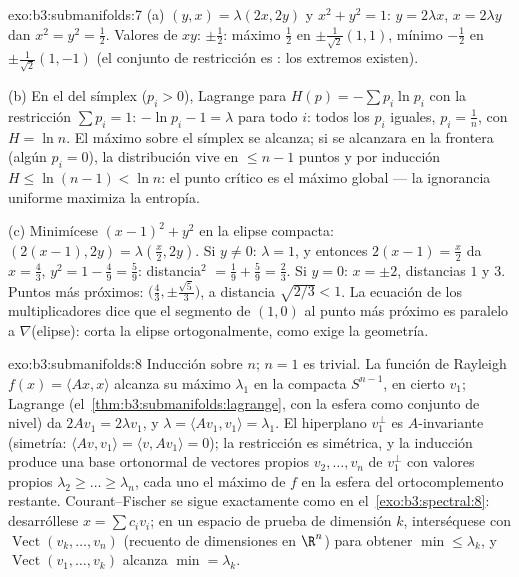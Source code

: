 \begin{solution}{exo:b3:submanifolds:7}
(a) $(y, x) = \lambda(2x, 2y)$ y $x^2 + y^2 = 1$: $y =
2\lambda x$, $x = 2\lambda y$ dan $x^2 = y^2 = \frac12$. Valores de
$xy$: $\pm\frac12$: máximo $\frac12$ en $\pm\frac1{\sqrt2}(1,1)$, mínimo
$-\frac12$ en $\pm\frac1{\sqrt2}(1,-1)$ (el conjunto de restricción es
: los extremos existen).

(b) En el  del símplex
($p_i > 0$), Lagrange para $H(p) = -\sum p_i\ln p_i$ con la restricción
$\sum p_i = 1$: $-\ln p_i - 1 = \lambda$ para todo $i$: todos los $p_i$
iguales, $p_i =
\frac1n$, con $H = \ln n$. El máximo sobre el símplex
 se alcanza; si se alcanzara
en la frontera (algún $p_i = 0$), la distribución vive en $\leq n - 1$
puntos y por inducción $H \leq \ln(n-1) < \ln n$: el punto crítico
 es el máximo global --- la
ignorancia uniforme maximiza la entropía.

(c) Minimícese $(x-1)^2 + y^2$ en la elipse
compacta:
$(2(x{-}1), 2y) = \lambda(\frac x2, 2y)$. Si $y \neq 0$: $\lambda = 1$,
y entonces $2(x - 1) = \frac x2$ da $x =
\frac43$, $y^2 = 1 - \frac49 = \frac59$: distancia$^2$ $=
\frac19 + \frac59 = \frac23$. Si $y = 0$: $x = \pm2$, distancias $1$ y
$3$. Puntos más próximos: $\bigl(\frac43,
\pm\frac{\sqrt5}3\bigr)$, a distancia $\sqrt{2/3} < 1$. La ecuación de
los multiplicadores dice que el segmento de $(1,0)$ al punto más próximo
es paralelo a $\nabla$(elipse): corta la elipse ortogonalmente, como
exige la geometría.
\end{solution}

\begin{solution}{exo:b3:submanifolds:8}
Inducción sobre $n$; $n = 1$ es trivial. La función de Rayleigh
$f(x) = \langle Ax, x\rangle$ alcanza su máximo $\lambda_1$ en la
compacta $S^{n-1}$, en cierto $v_1$;
Lagrange (el~\cref{thm:b3:submanifolds:lagrange}, con la esfera como
conjunto de nivel) da $2Av_1 = 2\lambda v_1$, y $\lambda = \langle Av_1,
v_1\rangle = \lambda_1$. El hiperplano $v_1^\perp$ es $A$-invariante
(simetría: $\langle Av, v_1\rangle = \langle
v, Av_1\rangle = 0$); la restricción es simétrica, y la inducción
produce una base ortonormal de vectores propios $v_2, \dots, v_n$ de
$v_1^\perp$ con valores propios $\lambda_2 \geq \dots \geq
\lambda_n$, cada uno el máximo de $f$ en la esfera del ortocomplemento
restante. Courant--Fischer se sigue exactamente como en
el~\cref{exo:b3:spectral:8}: desarróllese $x = \sum c_iv_i$; en un
espacio de prueba de dimensión $k$, interséquese con
$\operatorname{Vect}(v_k, \dots, v_n)$ (recuento de dimensiones en
$\R^n$) para obtener $\min \leq \lambda_k$, y
$\operatorname{Vect}(v_1, \dots, v_k)$ alcanza $\min =
\lambda_k$.
\end{solution}

